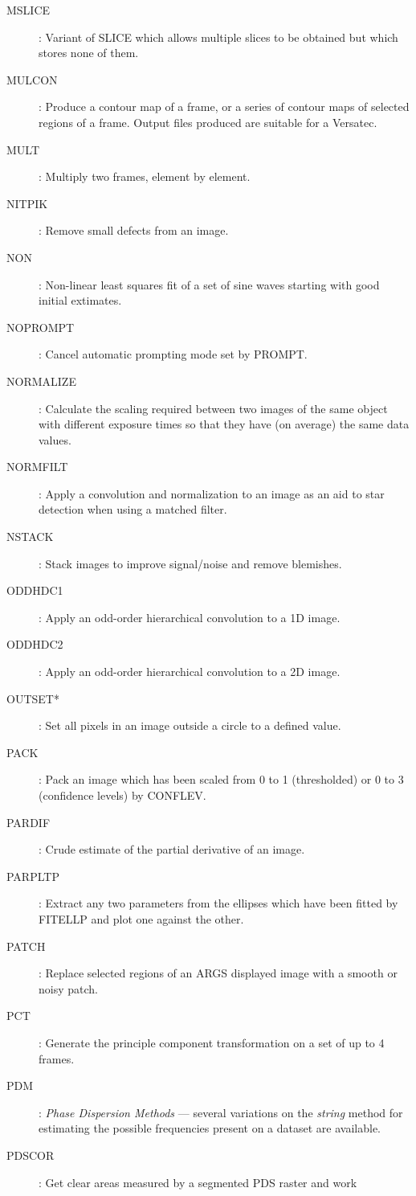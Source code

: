 \begin{description}
\item [MSLICE]: Variant of SLICE which allows multiple slices to be obtained
but which stores none of them.
\item [MULCON]: Produce a contour map of a frame, or a series of contour maps
of selected regions of a frame.
Output files produced are suitable for a Versatec.
\item [MULT]: Multiply two frames, element by element.
\item [NITPIK]: Remove small defects from an image.
\item [NON]: Non-linear least squares fit of a set of sine waves starting with
good initial extimates.
\item [NOPROMPT]: Cancel automatic prompting mode set by PROMPT.
\item [NORMALIZE]: Calculate the scaling required between two images of the
same object with different exposure times so that they have (on average) the
same data values.
\item [NORMFILT]: Apply a convolution and normalization to an image as an aid to
star detection when using a matched filter.
\item [NSTACK]: Stack images to improve signal/noise and remove blemishes.
\item [ODDHDC1]: Apply an odd-order hierarchical convolution to a 1D image.
\item [ODDHDC2]: Apply an odd-order hierarchical convolution to a 2D image.
\item [OUTSET*]: Set all pixels in an image outside a circle to a defined value.
\item [PACK]: Pack an image which has been scaled from 0 to 1 (thresholded) or
0 to 3 (confidence levels) by CONFLEV.
\item [PARDIF]: Crude estimate of the partial derivative of an image.
\item [PARPLTP]: Extract any two parameters from the ellipses which have been
fitted by FITELLP and plot one against the other.
\item [PATCH]: Replace selected regions of an ARGS displayed image with a
smooth or noisy patch.
\item [PCT]: Generate the principle component transformation on a set of up to 4
frames.
\item [PDM]: {\em Phase Dispersion Methods} --- several variations on the
{\em string} method for estimating the possible frequencies present on a
dataset are available.
\item [PDSCOR]: Get clear areas measured by a segmented PDS raster and work

\end{description}
